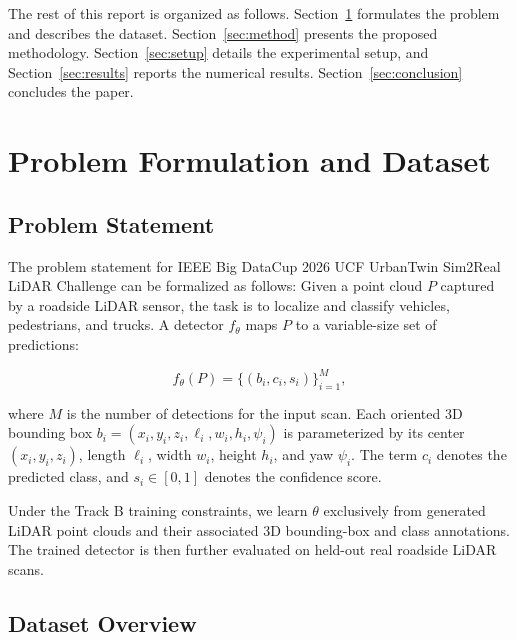 \documentclass[conference]{IEEEtran}
\begin{document}

The rest of this report is organized as follows. Section~\ref{sec:problem} formulates the problem and describes the dataset. Section~\ref{sec:method} presents the proposed methodology. Section~\ref{sec:setup} details the experimental setup, and Section~\ref{sec:results} reports the numerical results. Section~\ref{sec:conclusion} concludes the paper.

\section{Problem Formulation and Dataset}
\label{sec:problem}

\subsection{Problem Statement}

The problem statement for IEEE Big DataCup 2026 UCF UrbanTwin Sim2Real LiDAR Challenge can be formalized as follows: Given a point cloud $P$
captured by a roadside LiDAR sensor, the task is to localize and
classify vehicles, pedestrians, and trucks. A detector $f_\theta$
maps $P$ to a variable-size set of predictions:

\begin{equation}
    f_\theta(P) = \{(b_i, c_i, s_i)\}_{i=1}^{M},
    \label{eq:detector-output}
\end{equation}

where $M$ is the number of detections for the input scan.
Each oriented 3D bounding box
$b_i = (x_i, y_i, z_i, \ell_i, w_i, h_i, \psi_i)$
is parameterized by its center $(x_i, y_i, z_i)$,
length $\ell_i$, width $w_i$, height $h_i$, and yaw $\psi_i$.
The term $c_i$ denotes the predicted class, and $s_i \in [0,1]$ denotes the confidence score.

Under the Track B training constraints, we learn $\theta$ exclusively from generated LiDAR point clouds and their associated 3D bounding-box and class annotations. The trained detector is then further evaluated on held-out real roadside LiDAR scans.

\subsection{Dataset Overview}
\end{document}
